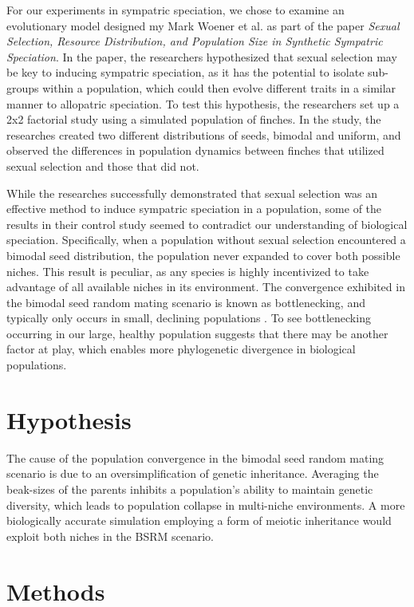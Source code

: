 \documentclass{article}
\begin{document}
For our experiments in sympatric speciation, we chose to examine an evolutionary model designed my Mark Woener et al. as part of the paper \textit{Sexual Selection, Resource Distribution, and Population Size in Synthetic Sympatric Speciation}. In the paper, the researchers hypothesized that sexual selection may be key to inducing sympatric speciation, as it has the potential to isolate sub-groups within a population, which could then evolve different traits in a similar manner to allopatric speciation. To test this hypothesis, the researchers set up a 2x2 factorial study using a simulated population of finches. In the study, the researches created two different distributions of seeds, bimodal and uniform, and observed the differences in population dynamics between finches that utilized sexual selection and those that did not.

While the researches successfully demonstrated that sexual selection was an effective method to induce sympatric speciation in a population, some of the results in their control study seemed to contradict our understanding of biological speciation. Specifically, when a population without sexual selection encountered a bimodal seed distribution, the population never expanded to cover both possible niches. This result is peculiar, as any species is highly incentivized to take advantage of all available niches in its environment. The convergence exhibited in the bimodal seed random mating scenario is known as bottlenecking, and typically only occurs in small, declining populations \cite{CHICKEN}. To see bottlenecking occurring in our large, healthy population suggests that there may be another factor at play, which enables more phylogenetic divergence in biological populations.



\section{Hypothesis}

The cause of the population convergence in the bimodal seed random mating scenario is due to an oversimplification of genetic inheritance. Averaging the beak-sizes of the parents inhibits a population’s ability to maintain genetic diversity, which leads to population collapse in multi-niche environments. A more biologically accurate simulation employing a form of meiotic inheritance would exploit both niches in the BSRM scenario.



\section{Methods}
\end{document}

